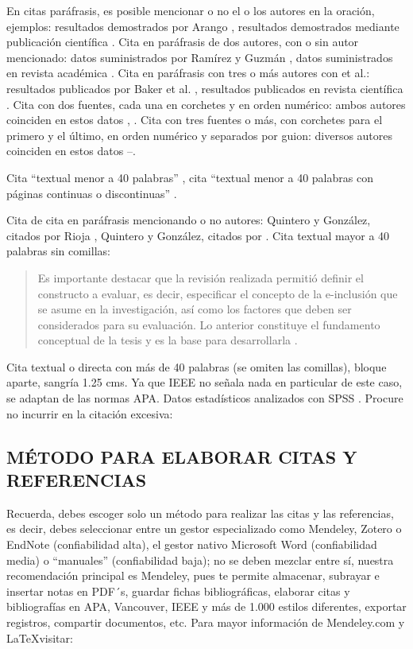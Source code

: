 En citas paráfrasis, es posible mencionar o no el o los autores en la oración, ejemplos: resultados demostrados por Arango \cite{sec:pediatria}, resultados demostrados mediante publicación científica \cite{sec:pediatria}. Cita en paráfrasis de dos autores, con o sin autor mencionado: datos suministrados por Ramírez y Guzmán \cite{opc:ramirez}, datos suministrados en revista académica \cite{opc:ramirez}. Cita en paráfrasis con tres o más autores con et al.: resultados publicados por Baker et al. \cite{art:baker}, resultados publicados en revista científica \cite{art:baker}. Cita con dos fuentes, cada una en corchetes y en orden numérico: ambos autores coinciden en estos datos \cite{opc:bbva}, \cite{opc:film}. Cita con tres fuentes o más, con corchetes para el primero y el último, en orden numérico y separados por guion: diversos autores coinciden en estos datos \cite{opc:bbva}–\cite{lib:ieee}. 

Cita “textual menor a 40 palabras” \cite[p. 466]{art:espectador}, cita “textual menor a 40 palabras con páginas continuas o discontinuas” \cite[pp. 15-16]{tes:tesis}.  %

Cita de cita en paráfrasis mencionando o no autores: Quintero y González, citados por Rioja \cite{con:conferencia}, Quintero y González, citados por \cite{con:conferencia}. Cita textual mayor a 40 palabras sin comillas:


    \begin{quotation}
    Es importante destacar que la revisión realizada permitió definir el constructo a evaluar, es decir, especificar el concepto de la e-inclusión que se asume en la investigación, así como los factores que deben ser considerados para su evaluación. Lo anterior constituye el fundamento conceptual de la tesis y es la base para desarrollarla \cite[p. 107]{art:acimed}. 
    \end{quotation}

Cita textual o directa con más de 40 palabras (se omiten las comillas), bloque aparte, sangría 1.25 cms. Ya que IEEE no señala nada en particular de este caso, se adaptan de las normas APA. Datos estadísticos analizados con SPSS \cite{opc:ibm}. Procure no incurrir en la citación excesiva:


\subsection*{MÉTODO PARA ELABORAR CITAS Y REFERENCIAS}
Recuerda, debes escoger solo un método para realizar las citas y las referencias, es decir, debes seleccionar entre un gestor especializado como Mendeley, Zotero o EndNote (confiabilidad alta), el gestor nativo Microsoft Word (confiabilidad media) o “manuales” (confiabilidad baja); no se deben mezclar entre sí, nuestra recomendación principal es Mendeley, pues te permite almacenar, subrayar e insertar notas en PDF´s, guardar fichas bibliográficas, elaborar citas y bibliografías en APA, Vancouver, IEEE y más de 1.000 estilos diferentes, exportar registros, compartir documentos, etc. Para mayor información de Mendeley.com y \LaTeX visitar:


